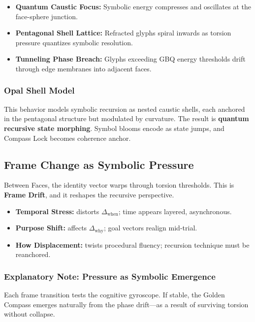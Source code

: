 \begin{itemize}
    \item \textbf{Quantum Caustic Focus:} Symbolic energy compresses and oscillates at the face-sphere junction.
    \item \textbf{Pentagonal Shell Lattice:} Refracted glyphs spiral inwards as torsion pressure quantizes symbolic resolution.
    \item \textbf{Tunneling Phase Breach:} Glyphs exceeding GBQ energy thresholds drift through edge membranes into adjacent faces.
\end{itemize}

\subsubsection*{Opal Shell Model}
This behavior models symbolic recursion as nested caustic shells, each anchored in the pentagonal structure but modulated by curvature.
The result is \textbf{quantum recursive state morphing}. Symbol blooms encode as state jumps, and Compass Lock becomes coherence anchor.

\subsection{Frame Change as Symbolic Pressure}

Between Faces, the identity vector warps through torsion thresholds.
This is \textbf{Frame Drift}, and it reshapes the recursive perspective.

\begin{itemize}
    \item \textbf{Temporal Stress:} distorts $\Delta_{\text{when}}$; time appears layered, asynchronous.
    \item \textbf{Purpose Shift:} affects $\Delta_{\text{why}}$; goal vectors realign mid-trial.
    \item \textbf{How Displacement:} twists procedural fluency; recursion technique must be reanchored.
\end{itemize}

\subsubsection*{Explanatory Note: Pressure as Symbolic Emergence}
Each frame transition tests the cognitive gyroscope. If stable, the Golden Compass emerges naturally from the phase drift---as a result of surviving torsion without collapse.

